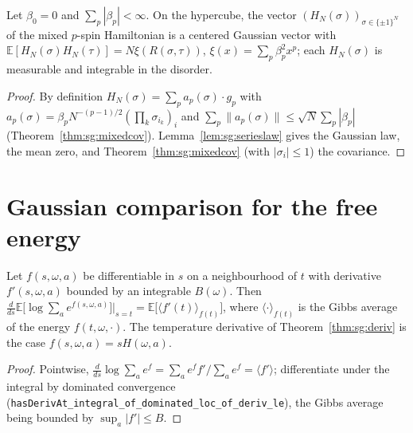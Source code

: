 \begin{theorem}\label{thm:sg:mixedgauss}
  \leanok
Let $\beta_0=0$ and $\sum_p|\beta_p|<\infty$. On the hypercube, the vector $(H_N(\sigma))_{\sigma\in\{\pm1\}^N}$ of the mixed $p$-spin
Hamiltonian is a centered Gaussian vector with $\mathbb E[H_N(\sigma)H_N(\tau)]=N\xi(R(\sigma,\tau))$, $\xi(x)=\sum_p\beta_p^2x^p$; each
$H_N(\sigma)$ is measurable and integrable in the disorder.
\end{theorem}

\begin{proof}
  \leanok
By definition $H_N(\sigma)=\sum_pa_p(\sigma)\cdot g_p$ with $a_p(\sigma)=\beta_pN^{-(p-1)/2}(\prod_k\sigma_{i_k})_{i}$ and
$\sum_p\|a_p(\sigma)\|\le\sqrt N\sum_p|\beta_p|$ (Theorem~\ref{thm:sg:mixedcov}). Lemma~\ref{lem:sg:serieslaw} gives the Gaussian law, the mean zero,
and Theorem~\ref{thm:sg:mixedcov} (with $|\sigma_i|\le1$) the covariance.
\end{proof}

\section{Gaussian comparison for the free energy}\label{sec:sg:comparison}

\begin{lemma}\label{lem:sg:pathderiv}
  \leanok
Let $f(s,\omega,a)$ be differentiable in $s$ on a neighbourhood of $t$ with derivative $f'(s,\omega,a)$ bounded by an integrable $B(\omega)$. Then
$\frac{d}{ds}\mathbb E\big[\log\sum_ae^{f(s,\omega,a)}\big]\big|_{s=t}=\mathbb E\big[\langle f'(t)\rangle_{f(t)}\big]$, where $\langle\cdot\rangle_{f(t)}$ is the
Gibbs average of the energy $f(t,\omega,\cdot)$. The temperature derivative of Theorem~\ref{thm:sg:deriv} is the case $f(s,\omega,a)=sH(\omega,a)$.
\end{lemma}

\begin{proof}
  \leanok
Pointwise, $\frac{d}{ds}\log\sum_ae^{f}=\sum_ae^{f}f'/\sum_ae^{f}=\langle f'\rangle$; differentiate under the integral by dominated convergence
(\texttt{hasDerivAt\_integral\_of\_dominated\_loc\_of\_deriv\_le}), the Gibbs average being bounded by $\sup_a|f'|\le B$.
\end{proof}

